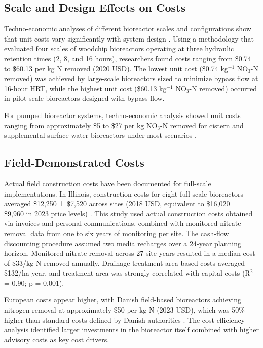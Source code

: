 \documentclass[12pt,a4paper]{article}
\begin{document}
\subsection{Scale and Design Effects on Costs}

Techno-economic analyses of different bioreactor scales and configurations show that unit costs vary significantly with system design \citep{RN312}. Using a methodology that evaluated four scales of woodchip bioreactors operating at three hydraulic retention times (2, 8, and 16 hours), researchers found costs ranging from \$0.74 to \$60.13 per kg N removed (2020 USD). The lowest unit cost (\$0.74 kg$^{-1}$ NO$_3$-N removed) was achieved by large-scale bioreactors sized to minimize bypass flow at 16-hour HRT, while the highest unit cost (\$60.13 kg$^{-1}$ NO$_3$-N removed) occurred in pilot-scale bioreactors designed with bypass flow.

For pumped bioreactor systems, techno-economic analysis showed unit costs ranging from approximately \$5 to \$27 per kg NO$_3$-N removed for cistern and supplemental surface water bioreactors under most scenarios \citep{RN312}.

\subsection{Field-Demonstrated Costs}

Actual field construction costs have been documented for full-scale implementations. In Illinois, construction costs for eight full-scale bioreactors averaged \$12,250 ± \$7,520 across sites (2018 USD, equivalent to \$16,020 ± \$9,960 in 2023 price levels) \citep{RN312}. This study used actual construction costs obtained via invoices and personal communications, combined with monitored nitrate removal data from one to six years of monitoring per site. The cash-flow discounting procedure assumed two media recharges over a 24-year planning horizon. Monitored nitrate removal across 27 site-years resulted in a median cost of \$33/kg N removed annually. Drainage treatment area-based costs averaged \$132/ha-year, and treatment area was strongly correlated with capital costs (R$^2$ = 0.90; p = 0.001).

European costs appear higher, with Danish field-based bioreactors achieving nitrogen removal at approximately \$50 per kg N (2023 USD), which was 50\% higher than standard costs defined by Danish authorities \citep{RN312}. The cost efficiency analysis identified larger investments in the bioreactor itself combined with higher advisory costs as key cost drivers.
\end{document}
